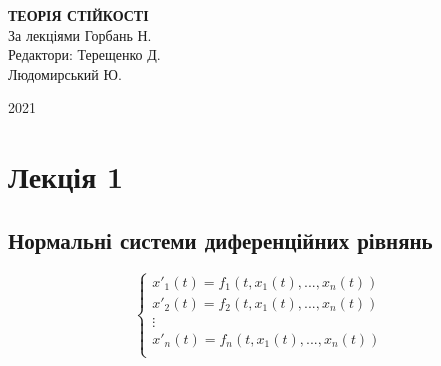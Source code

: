 \documentclass[14pt,a4paper]{scrartcl}
\theoremstyle{definition}
\newtheorem*{defo}{Означення}
\theoremstyle{remark}
\theoremstyle{definition}
\theoremstyle{definition}
\begin{document}
\def\be{\begin{equation}}
\def\ee{\end{equation}}

\def\bd{\begin{defo}}
\def\ed{\end{defo}}

\def\bbt{\begin{boxteo}}
\def\ebt{\end{boxteo}}

\def\i{\infty}
\def\d{\partial}

\begin{titlepage}
\begin{center}

\vspace*{0.1cm}
\vfill

{\huge \textbf{ТЕОРІЯ СТІЙКОСТІ}}\\
\vspace{5cm}
За лекціями Горбань Н.\\
\vspace{1cm}
Редактори: Терещенко Д.\\ \hspace{3.7cm} Людомирський Ю.

\vfill

2021

\end{center}
\end{titlepage}


\tableofcontents
\newpage

\section{Лекція 1}
\subsection{Нормальні системи диференційних рівнянь}


\be
\left\lbrace
\begin{gathered}
x'_1 (t) = f_1(t, x_1 (t), ... , x_n(t)) \\
x'_2 (t) = f_2(t, x_1 (t), ... , x_n(t)) \\
\vdots \\
    x'_n (t) = f_n(t, x_1 (t), ... , x_n(t)) \\
\end{gathered}\right.
\ee
\end{document}
